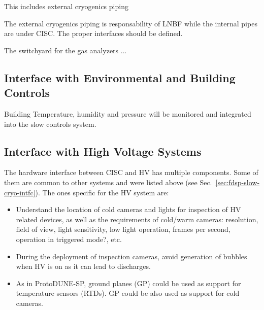 

This includes external cryogenics piping 

The external cryogenics piping is responsability of LNBF while the internal pipes are under CISC. The proper interfaces should be defined.

The switchyard for the gas analyzers ... 



\subsection{Interface with Environmental and Building Controls}
\label{sec:fdsp-slow-cryo-slow-enviro}


Building Temperature, humidity and pressure will be monitored and integrated into the slow controls system. 

\subsection{Interface with High Voltage Systems}
\label{sec:fdsp-slow-cryo-slow-hv}


The hardware interface between CISC and HV has multiple components. Some of them are common to other systems and were listed above (see Sec.~\ref{sec:fdsp-slow-cryo-intfc}).
The ones specific for the HV system are: 
\begin{itemize}
\item Understand the location of cold cameras and lights for inspection of HV related devices, as well as the requirements
  of cold/warm cameras: resolution, field of view, light sensitivity, low light operation, frames per second, operation in triggered mode?,  etc. 
\item During the deployment of inspection cameras, avoid generation of bubbles when HV is on as it can lead to discharges.
\item As in ProtoDUNE-SP, ground planes (GP) could be used as support for temperature sensors (RTDs). GP could be also used as support for cold cameras. 
\end{itemize}


